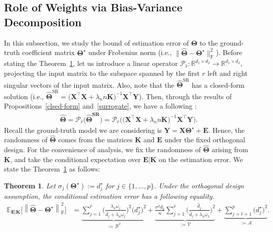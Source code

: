 \documentclass[12pt]{article}
\newtheorem{theorem}{Theorem}[section]
\begin{document}
\subsection{Role of Weights via Bias-Variance Decomposition}
In this subsection, we study the bound of estimation error of $\widehat{\mathbf{\Theta}}$ to the ground-truth coefficient matrix $\boldsymbol{\Theta^\star}$ under Frobenius norm (i.e., $\| \widehat{\mathbf{\Theta}} - \boldsymbol{\Theta^\star} \|_{\text{F}}^{2}$). 
Before stating the Theorem~\ref{Thm2}, let us introduce a linear operator $\mathcal{P}_{\widehat{r}}:\mathbb{R}^{d_{1} \times d_{2}}\rightarrow{\mathbb{R}^{d_{1} \times d_{2}}}$, projecting the input matrix to the subspace spanned by the first $\widehat{r}$ left and right singular vectors of the input matrix.
Also, note that the $\widehat{\mathbf{\Theta}}^{\text{SR}}$ has a closed-form solution (i.e.,  
$\widehat{\mathbf{\Theta}}^{\text{SR}}=\big(\mathbf{X}^{\top}\mathbf{X}+\lambda_{n}n\mathbf{K}\big)^{-1}\mathbf{X}^{\top}\mathbf{Y}$).
Then, through the results of Propositions~\ref{clsed-form} and~\ref{surrogate}, we have a following :
\begin{align} \label{Theta_hat}
    \widehat{\mathbf{\Theta}} 
    = \mathcal{P}_{\widehat{r}}\big( \boldsymbol{\widehat{\Theta}^\text{SR}} \big)
    = \mathcal{P}_{\widehat{r}}\big( \big(\mathbf{X}^{\top}\mathbf{X}+\lambda_{n}n\mathbf{K}\big)^{-1}\mathbf{X}^{\top}\mathbf{Y} \big).
\end{align}
Recall the ground-truth model we are considering is $\mathbf{Y}=\mathbf{X}\boldsymbol{\Theta^{\star}}+\mathbf{E}$. 
Hence, the randomness of $\widehat{\mathbf{\Theta}}$ comes from the matrices $\mathbf{K}$ and $\mathbf{E}$ under the fixed orthogonal design.
For the convenience of analysis, we fix the randomness of $\widehat{\mathbf{\Theta}}$ arising from $\mathbf{K}$, and take the conditional expectation over $\mathbf{E}|\mathbf{K}$ on the estimation error.
We state the Theorem~\ref{Thm2} as follows:

\begin{theorem} \label{Thm2}
Let $\sigma_{j}(\boldsymbol{\Theta}^{\star}):=d_{j}^{\star}$ for $j\in\{1,\dots,p\}$.
Under the orthogonal design assumption, the conditional estimation error has a following equality.
\begin{align*}
    \mathbb{E}_{\mathbf{E}|\mathbf{K}}\bigg[ \left\| \widehat{\mathbf{\Theta}} - \boldsymbol{\Theta^\star} \right\|_{\text{F}}^{2} \bigg]
    &= \underbrace{ \sum_{j=1}^{\widehat{r}}\bigg( \frac{\lambda_{n}\omega_{j}}{\widehat{d}_{j}+\lambda_{n}\omega_{j}} \bigg)^{2} \big(d_{j}^{\star}\big)^{2}}_{:=\mathcal{B}^{2}}
    +\underbrace{\frac{\sigma^{2}d_{2}}{n}\sum_{j=1}^{\widehat{r}}\bigg( \frac{\widehat{d}_{j}}{\widehat{d}_{j}+\lambda_{n}\omega_{j}} \bigg)^{2}}_{:=\mathcal{V}}
    + \underbrace{ \sum_{j=\widehat{r}+1}^{p} \big(d_{j}^{\star}\big)^{2}}_{:=\mathcal{A}}.
\end{align*}
\end{theorem}
\end{document}
